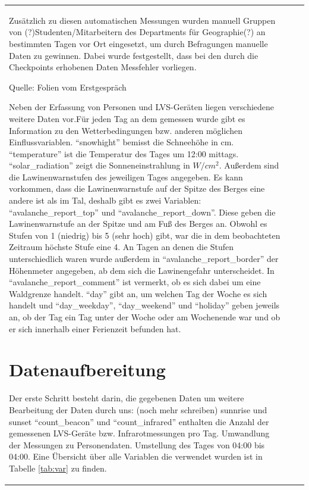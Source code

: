 \documentclass[11pt,a4paper]{report}
\begin{document}
\begin{table}
\begin{tabular}{p{3cm}|p{5cm}|p{4cm}}
\begin{document}
	Zusätzlich zu diesen automatischen Messungen wurden manuell Gruppen von (?)Studenten/Mitarbeitern des Departments für Geographie(?) an bestimmten Tagen vor Ort eingesetzt, um durch Befragungen manuelle Daten zu gewinnen. Dabei wurde festgestellt, dass bei den durch die Checkpoints erhobenen Daten Messfehler vorliegen.
	
	Quelle:
	Folien vom Erstgespräch
	
	Neben der Erfassung von Personen und LVS-Geräten liegen verschiedene weitere Daten vor.Für jeden Tag an dem gemessen wurde gibt es Information zu den Wetterbedingungen bzw. anderen möglichen Einflussvariablen. "`snowhight"' bemisst die Schneehöhe in cm. "`temperature"' ist die Temperatur des Tages um 12:00 mittags. "`solar\_radiation"' zeigt die Sonneneinstrahlung in $W/cm^2$. Außerdem sind die Lawinenwarnstufen des jeweiligen Tages angegeben. Es kann vorkommen, dass die Lawinenwarnstufe auf der Spitze des Berges eine andere ist als im Tal, deshalb gibt es zwei Variablen: "`avalanche\_report\_top"' und "`avalanche\_report\_down"'. Diese geben die Lawinenwarnstufe an der Spitze und am Fuß des Berges an. Obwohl es Stufen von 1 (niedrig) bis 5 (sehr hoch) gibt, war die in dem beobachteten Zeitraum höchste Stufe eine 4. An Tagen an denen die Stufen unterschiedlich waren wurde außerdem in "`avalanche\_report\_border"' der Höhenmeter angegeben, ab dem sich die Lawinengefahr unterscheidet. In "`avalanche\_report\_comment"' ist vermerkt, ob es sich dabei um eine Waldgrenze handelt. "`day"' gibt an, um welchen Tag der Woche es sich handelt und "`day\_weekday"', "`day\_weekend"' und "`holiday"' geben jeweils an, ob der Tag ein Tag unter der Woche oder am Wochenende war und ob er sich innerhalb einer Ferienzeit befunden hat.
	
	\section{Datenaufbereitung}
	Der erste Schritt besteht darin, die gegebenen Daten um weitere 
	Bearbeitung der Daten durch uns:
	(noch mehr schreiben)
	sunnrise und sunset
	"`count\_beacon"' und "`count\_infrared"' enthalten die Anzahl der gemessenen LVS-Geräte bzw. Infrarotmessungen pro Tag.
	Umwandlung der Messungen zu Personendaten. Umstellung des Tages von 04:00 bis 04:00.
	Eine Übersicht über alle Variablen die verwendet wurden ist in Tabelle  \ref{tab:var} zu finden.
	

\end{document}
\end{tabular}
\end{table}
\end{document}
